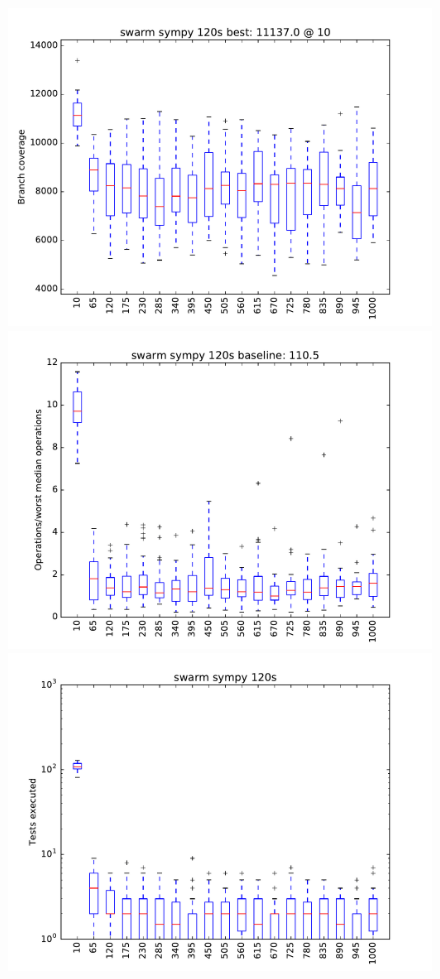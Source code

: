 \begin{figure}
\includegraphics[width=\columnwidth]{graphs/sympyswarm120}
\includegraphics[width=\columnwidth]{graphs/opssympyswarm120}
\includegraphics[width=\columnwidth]{graphs/execsympyswarm120}
\end{figure}


